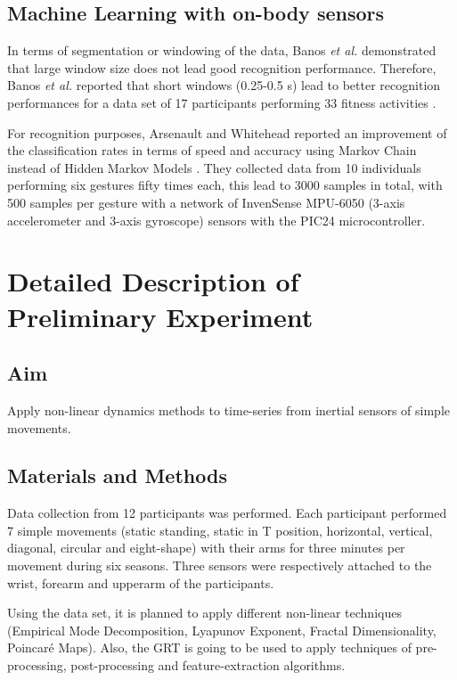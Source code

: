 \documentclass[9pt,journal,onecolumn,compsoc]{IEEEtran}
\begin{document}
\subsection{Machine Learning with on-body sensors}

 
In terms of segmentation or windowing of the data, Banos \textit{et al.} 
demonstrated that large window size does not lead good recognition performance.
Therefore, Banos \textit{et al.} reported that short windows (0.25-0.5 s) lead to better recognition performances 
for a data set of 17 participants performing 33 fitness activities \cite{Banos2014}. 
  
For recognition purposes, Arsenault and Whitehead reported an improvement of the classification rates
in terms of speed and accuracy using Markov Chain instead of Hidden Markov Models \cite{Arsenault2015_a, Arsenault2015_b}.
They collected data from 10 individuals performing six gestures fifty times each,
this lead to 3000 samples in total, with 500 samples per gesture
with a network of InvenSense MPU-6050 (3-axis accelerometer and 3-axis gyroscope) sensors with the  PIC24 microcontroller.
 
 
\section{Detailed Description of Preliminary Experiment}

\subsection{Aim}
Apply non-linear dynamics methods to time-series from inertial sensors of 
simple movements.

\subsection{Materials and Methods}
Data collection from 12 participants was performed. 
Each participant performed 7 simple movements (static standing, static in T position, horizontal,
vertical, diagonal, circular and eight-shape) with their arms for three minutes per movement
during six seasons.
Three sensors were respectively attached to the wrist, forearm and upperarm of the participants.

Using the data set, it is planned to apply different non-linear techniques 
(Empirical Mode Decomposition, Lyapunov Exponent, Fractal Dimensionality, Poincar\'e Maps).
Also, the GRT is going to be used to apply techniques of 
pre-processing, post-processing and feature-extraction algorithms.
\end{document}
